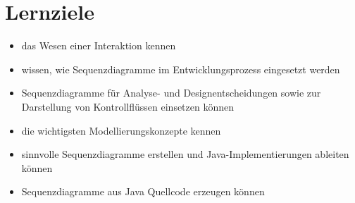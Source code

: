 \section{Lernziele}
\begin{itemize}
    \item das Wesen einer Interaktion kennen
    \item wissen, wie Sequenzdiagramme im Entwicklungsprozess eingesetzt werden
    \item Sequenzdiagramme für Analyse- und Designentscheidungen sowie zur Darstellung von Kontrollflüssen einsetzen können
    \item die wichtigsten Modellierungskonzepte kennen
    \item sinnvolle Sequenzdiagramme erstellen und Java-Implementierungen ableiten können
    \item Sequenzdiagramme aus Java Quellcode erzeugen können
\end{itemize}